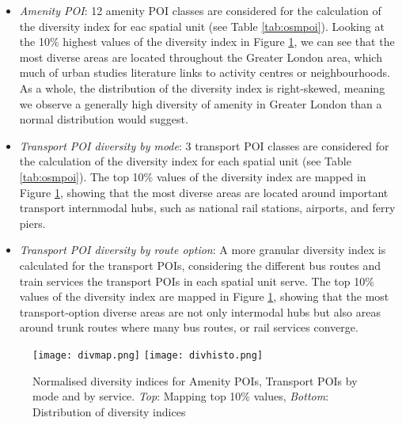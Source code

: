 \begin{itemize}
    \setlength\itemsep{0em}
    \item \textit{Amenity POI}: 12 amenity POI classes are considered for the calculation of the diversity index for eac spatial unit (see Table \ref{tab:osmpoi}). Looking at the 10\% highest values of the diversity index in Figure \ref{fig:diversity}, we can see that the most diverse areas are located throughout the Greater London area, which much of urban studies literature links to activity centres or neighbourhoods. As a whole, the distribution of the diversity index is right-skewed, meaning we observe a generally high diversity of amenity in Greater London than a normal distribution would suggest.
    \item \textit{Transport POI diversity by mode}: 3 transport POI classes are considered for the calculation of the diversity index for each spatial unit (see Table \ref{tab:osmpoi}). The top 10\% values of the diversity index are mapped in Figure \ref{fig:diversity}, showing that the most diverse areas are located around important transport internmodal hubs, such as national rail stations, airports, and ferry piers.
    \item \textit{Transport POI diversity by route option}: A more granular diversity index is calculated for the transport POIs, considering the different bus routes and train services the transport POIs in each spatial unit serve. The top 10\% values of the diversity index are mapped in Figure \ref{fig:diversity}, showing that the most transport-option diverse areas are not only intermodal hubs but also areas around trunk routes where many bus routes, or rail services converge.
\end{itemize}

\begin{figure}[ht]
    \centering
    \texttt{[image: divmap.png]}
    \centering
    \texttt{[image: divhisto.png]}
    \captionsetup{justification=centering}
    \caption{Normalised diversity indices for Amenity POIs, Transport POIs by mode and by service. \textit{Top}: Mapping top 10\% values, \textit{Bottom}: Distribution of diversity indices}
    \label{fig:diversity}
\end{figure}

